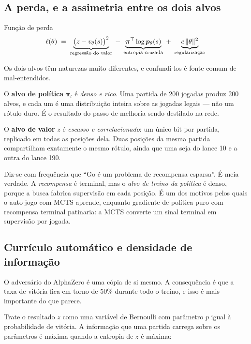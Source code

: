 \documentclass[11pt]{article}
\newcommand{\redeval}{v_{\theta}}
\newcommand{\redepol}{\bm{p}_{\theta}}
\newcommand{\raizpol}{\bm{\pi}}
\begin{document}
\subsection{A perda, e a assimetria entre os dois alvos}

\begin{teobox}{Função de perda}
\[
  \ell(\theta) \;=\;
  \underbrace{\bigl(z - \redeval(s)\bigr)^{2}}_{\text{regressão do valor}}
  \;-\; \underbrace{\raizpol^{\top}\log \redepol(s)}_{\text{entropia cruzada}}
  \;+\; \underbrace{c\,\norm{\theta}^{2}}_{\text{regularização}}
\]
\end{teobox}

Os dois alvos têm naturezas muito diferentes, e confundi-los é fonte comum de
mal-entendidos.

O \textbf{alvo de política} $\raizpol_t$ é \emph{denso e rico}. Uma partida de 200
jogadas produz 200 alvos, e cada um é uma distribuição inteira sobre as jogadas
legais — não um rótulo duro. É o resultado do passo de melhoria sendo destilado na
rede.

O \textbf{alvo de valor} $z$ é \emph{escasso e correlacionado}: um único bit por
partida, replicado em todas as posições dela. Duas posições da mesma partida
compartilham exatamente o mesmo rótulo, ainda que uma seja do lance 10 e a outra
do lance 190.

\begin{alertabox}
Diz-se com frequência que ``Go é um problema de recompensa esparsa''. É meia
verdade. A \emph{recompensa} é terminal, mas o \emph{alvo de treino da política} é
denso, porque a busca fabrica supervisão em cada posição. É um dos motivos pelos
quais o auto-jogo com MCTS aprende, enquanto gradiente de política puro com
recompensa terminal patinaria: a MCTS converte um sinal terminal em supervisão por
jogada.
\end{alertabox}

\subsection{Currículo automático e densidade de informação}

O adversário do AlphaZero é uma cópia de si mesmo. A consequência é que a taxa de
vitória fica em torno de 50\% durante todo o treino, e isso é mais importante do
que parece.

Trate o resultado $z$ como uma variável de Bernoulli com parâmetro $p$ igual à
probabilidade de vitória. A informação que uma partida carrega sobre os parâmetros
é máxima quando a entropia de $z$ é máxima:
\end{document}
